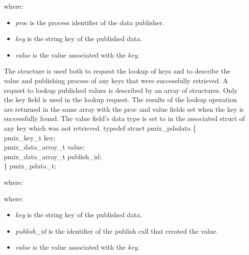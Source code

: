 where:
\begin{itemize}
    \item \emph{proc} is the process identifier of the data publisher.
    \item \emph{key} is the string key of the published data.
    \item \emph{value} is the value associated with the \emph{key}.
\end{itemize}


The  structure is used both to request the lookup of keys and to describe the value and publishing process of any keys that were successfully retrieved.
A request to lookup published values is described by an array of  structures.
Only the key field is used in the lookup request.
The results of the lookup operation are returned in the same array with the proc and value fields set when the key is successfully found.
The value field's data type is set to  in the associated  struct of any key which was not retrieved.
%
typedef struct pmix_pdsdata \{ \\
\hspace*{4\sigspace}pmix_key_t key; \\
\hspace*{4\sigspace}pmix_data_array_t value; \\
\hspace*{4\sigspace}pmix_data_array_t publish_id; \\
\} pmix_pdata_t;

where:

where:
\begin{itemize}
    \item \emph{key} is the string key of the published data.
    \item \emph{publish_id} is the identifier of the publish call that created the value.
    \item \emph{value} is the value associated with the \emph{key}.
\end{itemize}

\section{}

\summary

